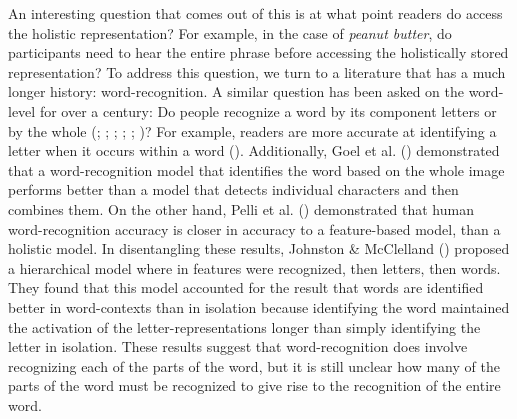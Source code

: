 \documentclass[
  12pt,
  letterpaper,
]{scrreport}
\begin{document}
An interesting question that comes out of this is at what point readers
do access the holistic representation? For example, in the case of
\emph{peanut butter}, do participants need to hear the entire phrase
before accessing the holistically stored representation? To address this
question, we turn to a literature that has a much longer history:
word-recognition. A similar question has been asked on the word-level
for over a century: Do people recognize a word by its component letters
or by the whole (; ;
;
;
;
)? For
example, readers are more accurate at identifying a letter when it
occurs within a word
(). Additionally, Goel et al.
() demonstrated that a
word-recognition model that identifies the word based on the whole image
performs better than a model that detects individual characters and then
combines them. On the other hand, Pelli et al.
() demonstrated
that human word-recognition accuracy is closer in accuracy to a
feature-based model, than a holistic model. In disentangling these
results, Johnston \& McClelland
()
proposed a hierarchical model where in features were recognized, then
letters, then words. They found that this model accounted for the result
that words are identified better in word-contexts than in isolation
because identifying the word maintained the activation of the
letter-representations longer than simply identifying the letter in
isolation. These results suggest that word-recognition does involve
recognizing each of the parts of the word, but it is still unclear how
many of the parts of the word must be recognized to give rise to the
recognition of the entire word.
\end{document}
